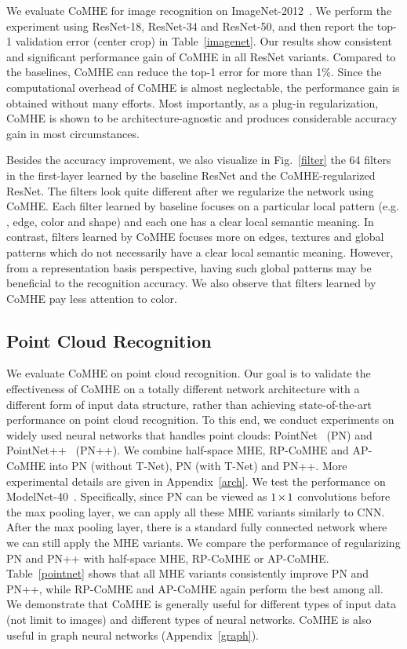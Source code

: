 We evaluate CoMHE for image recognition on ImageNet-2012~\cite{russakovsky2014imagenet}. We perform the experiment using ResNet-18, ResNet-34 and ResNet-50, and then report the top-1 validation error (center crop) in Table~\ref{imagenet}. Our results show consistent and significant performance gain of CoMHE in all ResNet variants. Compared to the baselines, CoMHE can reduce the top-1 error for more than 1\%. Since the computational overhead of CoMHE is almost neglectable, the performance gain is obtained without many efforts. Most importantly, as a plug-in regularization, CoMHE is shown to be architecture-agnostic and produces considerable accuracy gain in most circumstances.

\par
Besides the accuracy improvement, we also visualize in Fig.~\ref{filter} the 64 filters in the first-layer learned by the baseline ResNet and the CoMHE-regularized ResNet. The filters look quite different after we regularize the network using CoMHE. Each filter learned by baseline focuses on a particular local pattern (e.g. , edge, color and shape) and each one has a clear local semantic meaning. In contrast, filters learned by CoMHE focuses more on edges, textures and global patterns which do not necessarily have a clear local semantic meaning. However, from a representation basis perspective, having such global patterns may be beneficial to the recognition accuracy. We also observe that filters learned by CoMHE pay less attention to color.

\subsection{Point Cloud Recognition}

We evaluate CoMHE on point cloud recognition. Our goal is to validate the effectiveness of CoMHE on a totally different network architecture with a different form of input data structure, rather than achieving state-of-the-art performance on point cloud recognition. To this end, we conduct experiments on widely used neural networks that handles point clouds: PointNet~\cite{qi2017pointnet} (PN) and PointNet++~\cite{qi2017pointnet++} (PN++). We combine half-space MHE, RP-CoMHE and AP-CoMHE into PN (without T-Net), PN (with T-Net) and PN++. More experimental details are given in Appendix~\ref{arch}. We test the performance on ModelNet-40~\cite{wu20153d}. Specifically, since PN can be viewed as $\thickmuskip=2mu \medmuskip=2mu 1\times 1$ convolutions before the max pooling layer, we can apply all these MHE variants similarly to CNN. After the max pooling layer, there is a standard fully connected network where we can still apply the MHE variants. We compare the performance of regularizing PN and PN++ with half-space MHE, RP-CoMHE or AP-CoMHE. Table~\ref{pointnet} shows that all MHE variants consistently improve PN and PN++, while RP-CoMHE and AP-CoMHE again perform the best among all. We demonstrate that CoMHE is generally useful for different types of input data (not limit to images) and different types of neural networks. CoMHE is also useful in graph neural networks (Appendix~\ref{graph}).

